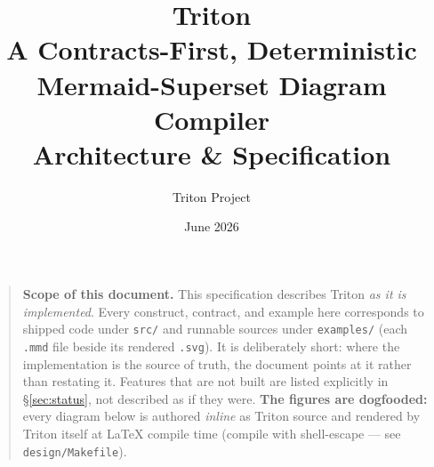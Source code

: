 \documentclass{MastersThesis}
\title{Triton\\[0.4em]\Large A Contracts-First, Deterministic\\
  Mermaid-Superset Diagram Compiler\\[0.3em]\normalsize Architecture \& Specification}
\author{Triton Project}
\date{June 2026}
\begin{document}
\maketitle

\begin{quote}\small
\textbf{Scope of this document.} This specification describes Triton \emph{as it
is implemented}. Every construct, contract, and example here corresponds to
shipped code under \texttt{src/} and runnable sources under \texttt{examples/}
(each \texttt{.mmd} file beside its rendered \texttt{.svg}). It is deliberately
short: where the implementation is the source of truth, the document points at
it rather than restating it. Features that are not built are listed explicitly in
\S\ref{sec:status}, not described as if they were. \textbf{The figures are
dogfooded:} every diagram below is authored \emph{inline} as Triton source and
rendered by Triton itself at \LaTeX{} compile time (compile with shell-escape ---
see \texttt{design/Makefile}).
\end{quote}

\tableofcontents
\newpage










\end{document}
